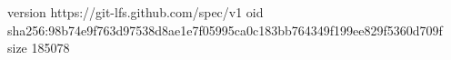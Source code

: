 version https://git-lfs.github.com/spec/v1
oid sha256:98b74e9f763d97538d8ae1e7f05995ca0c183bb764349f199ee829f5360d709f
size 185078
